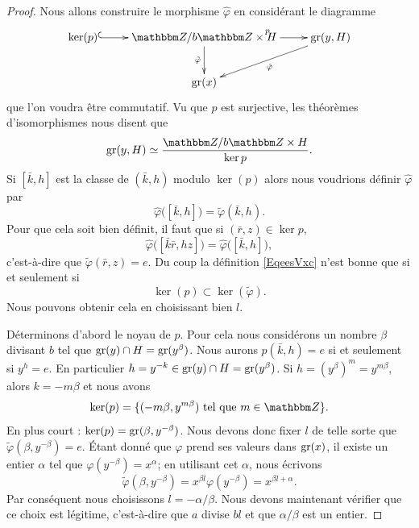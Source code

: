 \begin{proof}
    Nous allons construire le morphisme \( \hat \varphi\) en considérant le diagramme
    \begin{equation}
    \xymatrix{%
    \ker(p) \ar@{^{(}->}[r]        &   \eZ/b\eZ\times H\ar[d]_{\tilde \varphi}\ar[r]^p&\gr(y,H)\ar[ld]^{\hat \varphi}\\
          &   \gr(x)
       }
    \end{equation}
    que l'on voudra être commutatif. Vu que \( p\) est surjective, les théorèmes d'isomorphismes nous disent que
    \begin{equation}
        \gr(y,H)\simeq\frac{ \eZ/b\eZ\times H }{ \ker p }.
    \end{equation}
    Si \( [\bar k,h]\) est la classe de \( (\bar k,h)\) modulo \( \ker(p)\) alors nous voudrions définir \( \hat \varphi\) par
    \begin{equation}        \label{EqeesVxc}
        \hat\varphi\big( [\bar k,h] \big)=\tilde \varphi(\bar k,h).
    \end{equation}
    Pour que cela soit bien définit, il faut que si \( (\bar r,z)\in \ker p\),
    \begin{equation}
        \hat\varphi\big( [\bar k\bar r,hz] \big)=\hat\varphi\big( [\bar k,h] \big),
    \end{equation}
    c'est-à-dire que \( \tilde \varphi(\bar r,z)=e\). Du coup la définition \eqref{EqeesVxc} n'est bonne que si et seulement si
    \begin{equation}
        \ker(p)\subset\ker(\tilde\varphi ).
    \end{equation}
    Nous pouvons obtenir cela en choisissant bien \( l\).

    Déterminons d'abord le noyau de \( p\). Pour cela nous considérons un nombre \( \beta\) divisant \( b\) tel que \( \operatorname{gr}(y)\cap H=\operatorname{gr}(y^{\beta})\). Nous aurons \( p(\bar k,h)=e\) si et seulement si \( y^h=e\). En particulier \( h=y^{-k}\in\operatorname{gr}(y)\cap H=\operatorname{gr}(y^{\beta})\). Si \( h=(y^{\beta})^m=y^{m\beta}\), alors \( k=-m\beta\) et nous avons
    \begin{equation}
        \ker(p)=\{ (-m\beta,y^{m\beta})\tq m\in \eZ \}.
    \end{equation}
    En plus court : \( \ker(p)=\operatorname{gr}(\beta,y^{-\beta})\). Nous devons donc fixer \( l\) de telle sorte que \( \tilde \varphi(\beta,y^{-\beta})=e\). Étant donné que \( \varphi\) prend ses valeurs dans \( \operatorname{gr}(x)\), il existe un entier \( \alpha\) tel que \( \varphi(y^{-\beta})=x^{\alpha}\); en utilisant cet \( \alpha\), nous écrivons
    \begin{equation}
        \tilde \varphi(\beta,y^{-\beta})=x^{\beta l}\varphi(y^{-\beta})=x^{\beta l+\alpha}.
    \end{equation}
    Par conséquent nous choisissons \( l=-\alpha/\beta\). Nous devons maintenant vérifier que ce choix est légitime, c'est-à-dire que \( a\) divise \( bl\) et que \( \alpha/\beta\) est un entier.


\end{proof}
